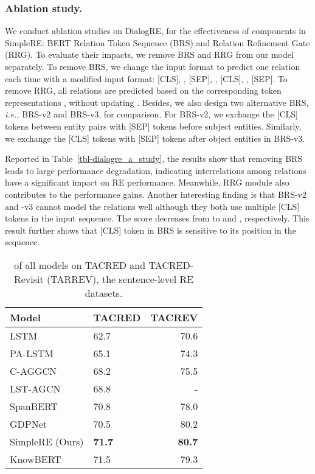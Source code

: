 \documentclass{article}
\newcommand{\ie}{\emph{i.e.,}\xspace}
\begin{document}
\subsubsection{Ablation study.} 
We conduct ablation studies on DialogRE, for the effectiveness of components in SimpleRE: BERT Relation Token Sequence (BRS) and Relation Refinement Gate (RRG). To evaluate their impacts, we remove BRS and RRG from our model separately. To remove BRS, we change the input format to predict one relation each time with a modified input format: [CLS], , [SEP], , [CLS], , [SEP]. To remove RRG, all relations are predicted based on the corresponding token representations , without updating . Besides, we also design two alternative BRS, \ie BRS-v2 and BRS-v3, for comparison. For BRS-v2, we exchange the [CLS] tokens between entity pairs with [SEP] tokens before subject entities. Similarly, we exchange the [CLS] tokens with [SEP] tokens after object entities in BRS-v3.

Reported in Table~\ref{tbl-dialogre_a_study}, the results show that removing BRS leads to large performance degradation, indicating interrelations among relations have a significant impact on RE performance. Meanwhile, RRG module also contributes to the performance gains. Another interesting finding is that BRS-v2 and -v3 cannot model the relations well although they both use multiple [CLS] tokens in the input sequence. The  score decreases from  to  and , respectively. This result further shows that [CLS] token in BRS is sensitive to its position in the sequence.

\begin{table}[t]
\centering
\small
\setlength{\tabcolsep}{4.0 pt}
\caption{ of all models on TACRED and TACRED-Revisit (TARREV), the sentence-level RE datasets.}
\begin{tabular}{l|l r}
\toprule
Model &  TACRED & TACREV \\
\midrule
LSTM~\cite{zhang-etal-2017-position}     & 62.7 & 70.6 \\
PA-LSTM~\cite{zhang-etal-2017-position}  & 65.1 & 74.3 \\
C-AGGCN~\cite{guo-etal-2019-attention}   & 68.2 & 75.5 \\
LST-AGCN~\cite{sun2020relation}          & 68.8 & -    \\ 
\midrule
SpanBERT~\cite{joshi2020spanbert}        & 70.8 & 78.0 \\
GDPNet~\cite{xue2020gdpnet}              & 70.5 & 80.2 \\
SimpleRE (Ours)                          & \textbf{71.7}  & \textbf{80.7} \\
\midrule
KnowBERT~\cite{Peters2019KnowledgeEC}    & 71.5 & 79.3  \\
\bottomrule
\end{tabular}
\label{tbl-tacred_eval}
\end{table}
\end{document}

